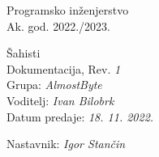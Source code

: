 \documentclass{article}
\begin{document}
\newenvironment{packed_enum}{
	\begin{enumerate}
		\setlength{\itemsep}{0pt}
		\setlength{\parskip}{0pt}
		\setlength{\parsep}{0pt}
	}{\end{enumerate}}

\newenvironment{packed_item}{
	\begin{itemize}
		\setlength{\itemsep}{0pt}
		\setlength{\parskip}{0pt}
		\setlength{\parsep}{0pt}
	}{\end{itemize}}
	
		\begin{titlepage}
		\begin{center}
			\LARGE Programsko inženjerstvo\\
			\large Ak. god. 2022./2023.\\
			
			
			\huge Šahisti\\
			\Large Dokumentacija, Rev. \textit{1}\\
			
			\normalsize
			Grupa: \textit{AlmostByte}\\
			Voditelj: \textit{Ivan Bilobrk}\\
			
			
			Datum predaje: \textit{18. 11. 2022.}\\
			
			
			Nastavnik: \textit{Igor Stančin}\\
			
		\end{center}
		
		
	\end{titlepage}

	\tableofcontents
	\eject
		
\end{document}
